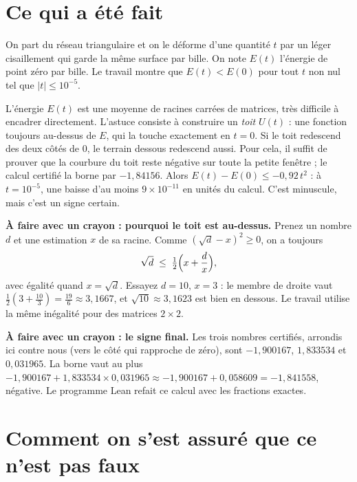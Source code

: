 \section*{Ce qui a été fait}

On part du réseau triangulaire et on le déforme d'une quantité $t$ par un léger cisaillement
qui garde la même surface par bille. On note $E(t)$ l'énergie de point zéro par bille. Le
travail montre que $E(t)<E(0)$ pour tout $t$ non nul tel que $|t|\le 10^{-5}$.

L'énergie $E(t)$ est une moyenne de racines carrées de matrices, très difficile à encadrer
directement. L'astuce consiste à construire un \emph{toit} $U(t)$ : une fonction toujours
au-dessus de $E$, qui la touche exactement en $t=0$. Si le toit redescend des deux côtés de
$0$, le terrain dessous redescend aussi. Pour cela, il suffit de prouver que la courbure du
toit reste négative sur toute la petite fenêtre ; le calcul certifié la borne par $-1{,}84156$.
Alors $E(t)-E(0)\le -0{,}92\,t^2$ : à $t=10^{-5}$, une baisse d'au moins
$9\times10^{-11}$ en unités du calcul. C'est minuscule, mais c'est un signe certain.

\begin{encadre}
\textbf{À faire avec un crayon : pourquoi le toit est au-dessus.} Prenez un nombre $d$ et une estimation $x$
de sa racine. Comme $(\sqrt d - x)^2\ge 0$, on a toujours
\[\sqrt d\;\le\;\tfrac12\Bigl(x+\frac{d}{x}\Bigr),\]
avec égalité quand $x=\sqrt d$. Essayez $d=10$, $x=3$ : le membre de droite vaut
$\tfrac12(3+\tfrac{10}{3})=\tfrac{19}{6}\approx3{,}1667$, et $\sqrt{10}\approx3{,}1623$ est
bien en dessous. Le travail utilise la même inégalité pour des matrices $2\times2$.

\textbf{À faire avec un crayon : le signe final.} Les trois nombres certifiés, arrondis ici
contre nous (vers le côté qui rapproche de zéro), sont $-1{,}900167$, $1{,}833534$ et
$0{,}031965$. La borne vaut au plus
$-1{,}900167+1{,}833534\times0{,}031965\approx-1{,}900167+0{,}058609=-1{,}841558$,
négative. Le programme Lean refait ce calcul avec les fractions exactes.
\end{encadre}

\section*{Comment on s'est assuré que ce n'est pas faux}

